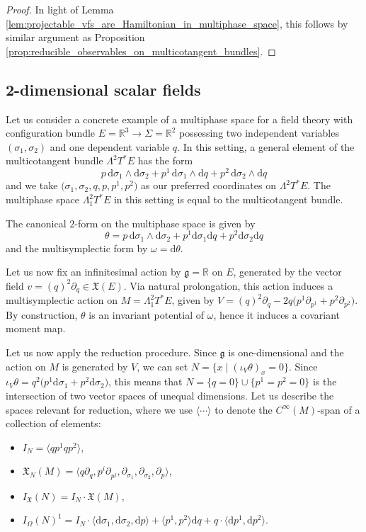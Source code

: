 \documentclass[10pt,a4paper]{amsart}
\numberwithin{equation}{section}
\newcommand{\g}{\mathfrak{g}}
\newcommand{\tgtvanform}{I_{\Omega}(N)}
\newcommand{\tgtvf}{\mathfrak X_N(M)}
\newcommand{\vanvf}{I_{\mathfrak{X}}(N)}%
\renewcommand{\d}{\mathrm{d}}
\begin{document}
\begin{proof}
	In light of Lemma \ref{lem:projectable_vfs_are_Hamiltonian_in_multiphase_space}, this follows by similar argument as Proposition \ref{prop:reducible_observables_on_multicotangent_bundles}.
\end{proof}

\subsection{2-dimensional scalar fields}\label{Ssec:2dim-ScalarField}

Let us consider a concrete example of a multiphase space for a field theory with configuration bundle $E=\mathbb R^3\to \Sigma=\mathbb R^2$ possessing two independent variables $(\sigma_1,\sigma_2)$ and one dependent variable $q$. In this setting, a general element of the multicotangent bundle $\Lambda^2T^*E$ has the form
\[
	p\,\d\sigma_1\wedge \d\sigma_2+p^1\,\d\sigma_1\wedge\d q+p^2\,\d\sigma_2\wedge\d q
\]
and we take $\bigl(\sigma_1,\sigma_2,q, p, p^1,p^2\bigr)$ as our preferred coordinates on $\Lambda^2T^*E$. The multiphase space $\Lambda_1^2T^*E$ in this setting is equal to the multicotangent bundle.

The canonical $2$-form on the multiphase space is given by
\[
	\theta=p\,\d\sigma_1\wedge \d\sigma_2+p^1\d\sigma_1\d q+p^2\d\sigma_2\d q
\]
and the multisymplectic form by $\omega=\d\theta$.

Let us now fix an infinitesimal action by $\mathfrak g=\mathbb R$ on $E$, generated by the vector field $v=(q)^2\partial_{q}\in\mathfrak X(E)$. Via natural prolongation, this action induces a multisymplectic action on $M=\Lambda_1^2T^*E$, given by  $V=(q)^2\partial_{q}-2q\bigl(p^1\partial_{p^1}+p^2\partial_{p^2}\bigr)$. By construction, $\theta$ is an invariant potential of $\omega$, hence it induces a covariant moment map.

Let us now apply the reduction procedure. Since $\g$ is one-dimensional and the action on $M$ is generated by $V$, we can set $N=\{x\mid (\iota_V\theta)_x=0\}$. Since $\iota_V\theta=q^2\bigl(p^1\d\sigma_1+ p^2\d\sigma_2\bigr)$, this means that $N=\{q=0\}\cup \bigl\{p^1=p^2=0\bigr\}$ is the intersection of two vector spaces of unequal dimensions. Let us describe the spaces relevant for reduction, where we use $\langle\cdots\rangle$ to denote the $C^\infty(M)$-span of a collection of elements:
\begin{itemize}\itemsep=0pt
	\item $I_N=\bigl\langle qp^1 qp^2\bigr\rangle$,
	\item $\tgtvf=\bigl\langle q\partial_{q}, p^i\partial_{p^j}, \partial_{\sigma_1}, \partial_{\sigma_2},  \partial_p  \bigr\rangle$,
	\item $\vanvf=I_N\cdot\mathfrak X(M)$,
	\item $\tgtvanform^1=I_N\cdot \langle \d{\sigma_1}, \d{\sigma_2}, \d p \rangle + \bigl\langle p^1,p^2\bigr\rangle \d q+ q\cdot \bigl\langle \d p^1,\d p^2\bigr\rangle$.
\end{itemize}
\end{document}
